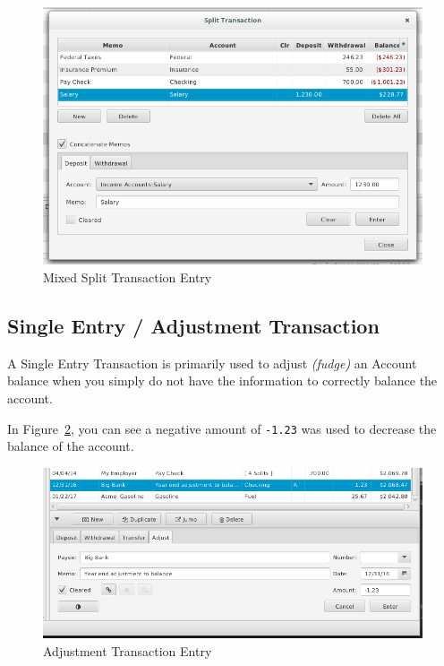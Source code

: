 \documentclass[letterpaper,12pt]{book}
\begin{document}
    \begin{figure}[H]        
        \caption{Mixed Split Transaction Entry} \label{fig:mixed-split-trans}
        \includegraphics[width=1.0\linewidth]{images/mixedSplitTransaction}               
    \end{figure}

    \subsection{Single Entry / Adjustment Transaction}\label{subsec:single-entry-/-adjustment-transaction}
    A Single Entry Transaction is primarily used to adjust \textit{(fudge)} an Account balance when you simply do not
    have the information to correctly balance the account.

    In Figure~\ref{fig:adjustment-trans}, you can see a negative amount of \texttt{-1.23} was used to decrease the balance of the account.

    \begin{figure}[H]
        \caption{Adjustment Transaction Entry} \label{fig:adjustment-trans}
        \includegraphics[width=1.0\linewidth]{images/adjustmentTransaction}
    \end{figure}
\end{document}
